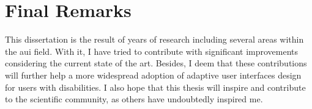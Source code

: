 \section{Final Remarks}
\label{sec:final_remarks}

This dissertation is the result of years of research including several areas
within the \acl{aui} field. With it, I have tried to contribute
with significant improvements considering the current state of the art. Besides,
I deem that these contributions will further help a more widespread adoption of 
adaptive user interfaces design for users with disabilities. I also hope that 
this thesis will inspire and contribute to the scientific community, as others 
have undoubtedly inspired me. 